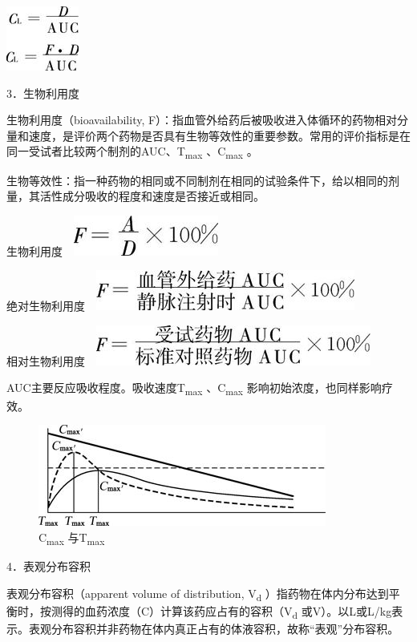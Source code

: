 \includegraphics{./images/Image00061.jpg}

3．生物利用度

生物利用度（bioavailability,
F）：指血管外给药后被吸收进入体循环的药物相对分量和速度，是评价两个药物是否具有生物等效性的重要参数。常用的评价指标是在同一受试者比较两个制剂的AUC、T\textsubscript{max}
、C\textsubscript{max} 。

生物等效性：指一种药物的相同或不同制剂在相同的试验条件下，给以相同的剂量，其活性成分吸收的程度和速度是否接近或相同。

生物利用度　\includegraphics{./images/Image00062.jpg}

绝对生物利用度　\includegraphics{./images/Image00063.jpg}

相对生物利用度　\includegraphics{./images/Image00064.jpg}

AUC主要反应吸收程度。吸收速度T\textsubscript{max} 、C\textsubscript{max}
影响初始浓度，也同样影响疗效。

\begin{figure}[!htbp]
 \centering
 \includegraphics{./images/Image00065.jpg}
 \captionsetup{justification=centering}
 \caption{C\textsubscript{max} 与T\textsubscript{max}}
 \label{fig3-21}
  \end{figure} 

4．表观分布容积

表观分布容积（apparent volume of distribution, V\textsubscript{d}
）指药物在体内分布达到平衡时，按测得的血药浓度（C）计算该药应占有的容积（V\textsubscript{d}
或V）。以L或L/kg表示。表观分布容积并非药物在体内真正占有的体液容积，故称“表观”分布容积。

